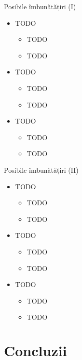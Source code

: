 \documentclass[9pt]{beamer}
\begin{document}
\begin{frame}{Posibile îmbunătățiri (I)}
\begin{itemize}
    \item \Large{TODO}
    \begin{itemize}
		\vskip5pt
		\item TODO
		\vskip5pt
		\item TODO
	\end{itemize}
	\vskip10pt
	\item \Large{TODO}
    \begin{itemize}
		\vskip5pt
		\item TODO
		\vskip5pt
		\item TODO
	\end{itemize}
	\item \Large{TODO}
    \begin{itemize}
		\vskip5pt
		\item TODO
		\vskip5pt
		\item TODO
	\end{itemize}
\end{itemize}
\end{frame}

\begin{frame}{Posibile îmbunătățiri (II)}
\begin{itemize}
    \item \Large{TODO}
    \begin{itemize}
		\vskip5pt
		\item TODO
		\vskip5pt
		\item TODO
	\end{itemize}
	\vskip10pt
	\item \Large{TODO}
    \begin{itemize}
		\vskip5pt
		\item TODO
		\vskip5pt
		\item TODO
	\end{itemize}
	\item \Large{TODO}
    \begin{itemize}
		\vskip5pt
		\item TODO
		\vskip5pt
		\item TODO
	\end{itemize}
\end{itemize}
\end{frame}

\section[]{Concluzii}
\end{document}
